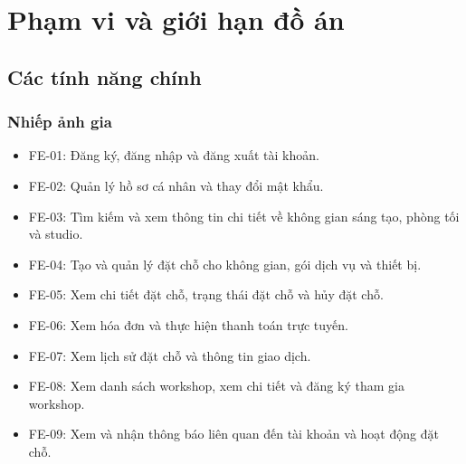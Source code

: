 \section{Phạm vi và giới hạn đồ án}

\subsection{Các tính năng chính}

\subsubsection{Nhiếp ảnh gia}
\begin{itemize}
	\item FE-01: Đăng ký, đăng nhập và đăng xuất tài khoản.
	\item FE-02: Quản lý hồ sơ cá nhân và thay đổi mật khẩu.
	\item FE-03: Tìm kiếm và xem thông tin chi tiết về không gian sáng tạo, phòng tối và studio.
	\item FE-04: Tạo và quản lý đặt chỗ cho không gian, gói dịch vụ và thiết bị.
	\item FE-05: Xem chi tiết đặt chỗ, trạng thái đặt chỗ và hủy đặt chỗ.
	\item FE-06: Xem hóa đơn và thực hiện thanh toán trực tuyến.
	\item FE-07: Xem lịch sử đặt chỗ và thông tin giao dịch.
	\item FE-08: Xem danh sách workshop, xem chi tiết và đăng ký tham gia workshop.
	\item FE-09: Xem và nhận thông báo liên quan đến tài khoản và hoạt động đặt chỗ.
\end{itemize}


